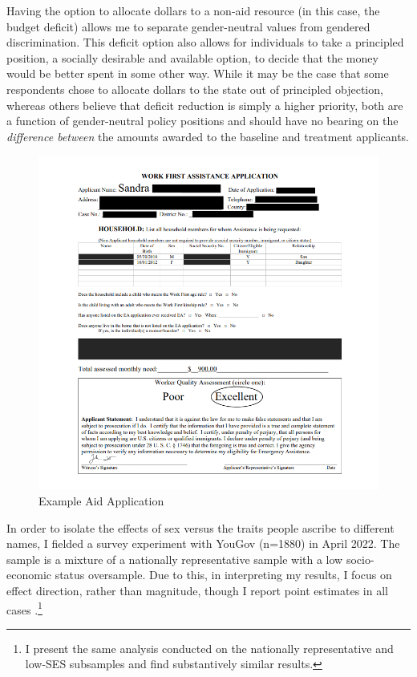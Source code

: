 \documentclass[12pt]{article}%
\begin{document}
\begin{doublespace}
Having the option to allocate dollars to a non-aid resource (in this case, the budget deficit) allows me to separate gender-neutral values from gendered discrimination. This deficit option also allows for individuals to take a principled position, a socially desirable and available option, to decide that the money would be better spent in some other way. While it may be the case that some respondents chose to allocate dollars to the state out of principled objection, whereas others believe that deficit reduction is simply a higher priority, both are a function of gender-neutral policy positions and should have no bearing on the \textit{difference between} the amounts awarded to the baseline and treatment applicants.

\begin{figure}[h!]
	\centering
	\includegraphics[scale=1]{figs/example_treatment.png}
	\caption{Example Aid Application}
	\label{figure2}
\end{figure}


In order to isolate the effects of sex versus the traits people ascribe to different names, I fielded a survey experiment with YouGov (n=1880) in April 2022. The sample is a mixture of a nationally representative sample with a low socio-economic status oversample. Due to this, in interpreting my results, I focus on effect direction, rather than magnitude, though I report point estimates in all cases \citep{horton2011online}.\footnote{I present the same analysis conducted on the nationally representative and low-SES subsamples and find substantively similar results.} 


\end{doublespace}
\end{document}
